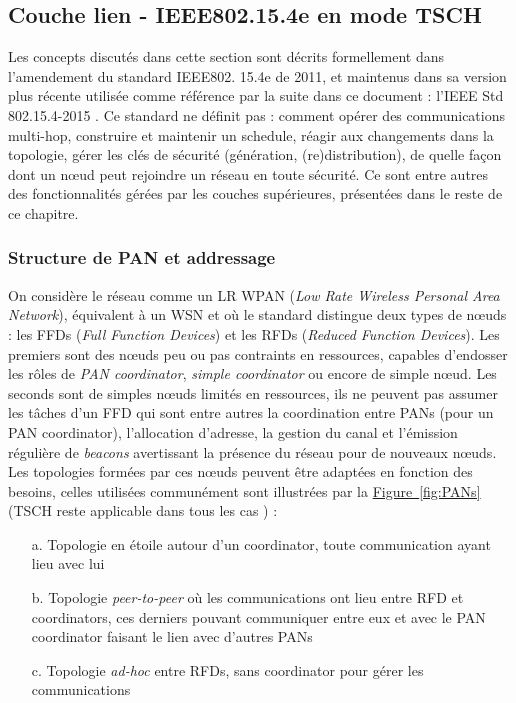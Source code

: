 \documentclass[]{report}
\newcommand{\wordlink}[2]{\hyperref[#2]{#1~\ref{#2}}}
\begin{document}
\newpage
	
	\subsection{Couche lien - IEEE802.15.4e en mode TSCH}
	\label{802.15.4e}	

\par Les concepts discutés dans cette section sont décrits formellement dans l'amendement du standard IEEE802. 15.4e de 2011, et maintenus dans sa version plus récente utilisée comme référence par la suite dans ce document : l'IEEE Std 802.15.4-2015 \cite{IEEE802.15.4}. Ce standard ne définit pas \cite{rfc7554} : comment opérer des communications multi-hop, construire et maintenir un schedule, réagir aux changements dans la topologie, gérer les clés de sécurité (génération, (re)distribution), de quelle façon dont un nœud peut rejoindre un réseau en toute sécurité. Ce sont entre autres des fonctionnalités gérées par les couches supérieures, présentées dans le reste de ce chapitre.
	
\subsubsection{Structure de PAN et addressage}

On considère le réseau comme un LR WPAN (\textit{Low Rate Wireless Personal Area Network}), équivalent à un WSN et où le standard distingue deux types de nœuds : les FFDs (\textit{Full Function Devices}) et les RFDs (\textit{Reduced Function Devices}). Les premiers sont des nœuds peu ou pas contraints en ressources, capables d'endosser les rôles de \textit{PAN coordinator}, \textit{simple coordinator} ou encore de simple nœud. Les seconds sont de simples nœuds limités en ressources, ils ne peuvent pas assumer les tâches d'un FFD qui sont entre autres la coordination entre PANs (pour un PAN coordinator), l'allocation d'adresse, la gestion du canal et l'émission régulière de \textit{beacons} avertissant la présence du réseau pour de nouveaux nœuds. Les topologies formées par ces nœuds peuvent être adaptées en fonction des besoins, celles utilisées communément sont illustrées par la \wordlink{Figure}{fig:PANs} (TSCH reste applicable dans tous les cas \cite{IEEE802.15.4}) :
\vspace{0.2cm}
\begin{itemize}
\item[a.] Topologie en étoile autour d'un coordinator, toute communication ayant lieu avec lui
\vspace{0.1cm}
\item[b.] Topologie \textit{peer-to-peer} où les communications ont lieu entre RFD et coordinators, ces derniers pouvant communiquer entre eux et avec le PAN coordinator faisant le lien avec d'autres PANs
\vspace{0.1cm}
\item[c.] Topologie \textit{ad-hoc} entre RFDs, sans coordinator pour gérer les communications
\end{itemize}
\end{document}
